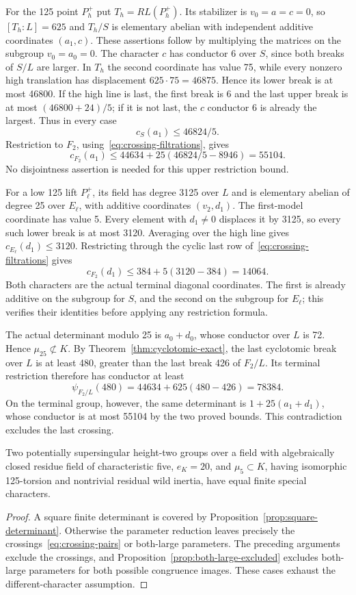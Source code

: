 For the 125 point $P_h^+$ put $T_h=R L(P_h^+)$. Its stabilizer is $v_0=a=c=0$, so $[T_h:L]=625$ and $T_h/S$ is elementary abelian with independent additive coordinates $(a_1,c)$. These assertions follow by multiplying the matrices on the subgroup $v_0=a_0=0$. The character $c$ has conductor 6 over $S$, since both breaks of $S/L$ are larger. In $T_h$ the second coordinate has value 75, while every nonzero high translation has displacement $625\cdot75=46875$. Hence its lower break is at most 46800. If the high line is last, the first break is 6 and the last upper break is at most $(46800+24)/5$; if it is not last, the $c$ conductor 6 is already the largest. Thus in every case
\[
                         c_S(a_1)\le46824/5.
\]
Restriction to $F_2$, using~\eqref{eq:crossing-filtrations}, gives
\begin{equation}\label{eq:crossing-diagonal-bounds}
 c_{F_2}(a_1)\le44634+25(46824/5-8946)=55104.
\end{equation}
No disjointness assertion is needed for this upper restriction bound.

For a low 125 lift $P_\ell^+$, its field has degree 3125 over $L$ and is elementary abelian of degree 25 over $E_\ell$, with additive coordinates $(v_2,d_1)$. The first-model coordinate has value 5. Every element with $d_1\ne0$ displaces it by 3125, so every such lower break is at most 3120. Averaging over the high line gives $c_{E_\ell}(d_1)\le3120$. Restricting through the cyclic last row of~\eqref{eq:crossing-filtrations} gives
\[
                    c_{F_2}(d_1)\le384+5(3120-384)=14064.
\]
Both characters are the actual terminal diagonal coordinates. The first is already additive on the subgroup for $S$, and the second on the subgroup for $E_\ell$; this verifies their identities before applying any restriction formula.

The actual determinant modulo 25 is $a_0+d_0$, whose conductor over $L$ is 72. Hence $\mu_{25}\not\subset K$. By Theorem~\ref{thm:cyclotomic-exact}, the last cyclotomic break over $L$ is at least 480, greater than the last break 426 of $F_2/L$. Its terminal restriction therefore has conductor at least
\[
                  \psi_{F_2/L}(480)=44634+625(480-426)=78384.
\]
On the terminal group, however, the same determinant is $1+25(a_1+d_1)$, whose conductor is at most 55104 by the two proved bounds. This contradiction excludes the last crossing.

\begin{theorem}\label{thm:wild-five-recovery}
Two potentially supersingular height-two groups over a field with algebraically closed residue field of characteristic five, $e_K=20$, and $\mu_5\subset K$, having isomorphic 125-torsion and nontrivial residual wild inertia, have equal finite special characters.
\end{theorem}
\begin{proof}
A square finite determinant is covered by Proposition~\ref{prop:square-determinant}. Otherwise the parameter reduction leaves precisely the crossings~\eqref{eq:crossing-pairs} or both-large parameters. The preceding arguments exclude the crossings, and Proposition~\ref{prop:both-large-excluded} excludes both-large parameters for both possible congruence images. These cases exhaust the different-character assumption.
\end{proof}
